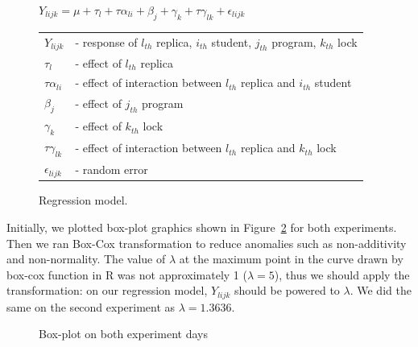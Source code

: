 \begin{figure}
\begin{center}
$Y_{lijk} = \mu + \tau_{l} + \tau\alpha_{li} + \beta_{j} + \gamma_{k} + \tau\gamma_{lk} + \epsilon_{lijk}$\\
\vspace{4mm}
\begin{tabular}{ll}
$Y_{lijk}$ & - response of $l_{th}$ replica, $i_{th}$ student, $j_{th}$ program, $k_{th}$ lock \\
$\tau_{l}$ & - effect of $l_{th}$ replica \\
$\tau\alpha_{li}$ & - effect of interaction between $l_{th}$ replica and $i_{th}$ student \\
$\beta_{j}$ & - effect of $j_{th}$ program \\
$\gamma_{k}$ & - effect of $k_{th}$ lock \\
$\tau\gamma_{lk}$ & - effect of interaction between $l_{th}$ replica and $k_{th}$ lock \\
$\epsilon_{lijk}$ & - random error \\
\end{tabular}
\caption{Regression model.}\label{fig:model}
\end{center}
\end{figure}

Initially, we plotted box-plot graphics shown in Figure~\ref{fig:boxplot} for both experiments. Then we ran Box-Cox transformation to reduce anomalies such as non-additivity and non-normality. The value of $\lambda$ at the maximum point in the curve drawn by box-cox function in R was not approximately 1 ($\lambda = 5$), thus we should apply the transformation: on our regression model, $Y_{lijk}$ should be powered to $\lambda$. We did the same on the second experiment as $\lambda = 1.3636$.

\begin{figure}%
    \centering
    \qquad
    \caption{Box-plot on both experiment days}\label{fig:boxplots}%
    \label{fig:boxplot}%
\end{figure}

